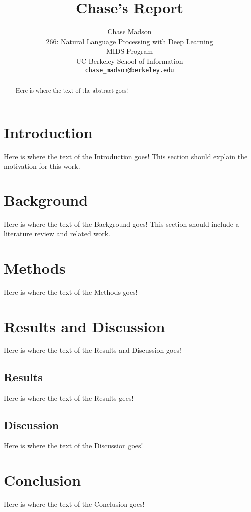 \documentclass[11pt,a4paper]{article}
\title{Chase's Report}
\author{Chase Madson \\
  266: Natural Language Processing with Deep Learning \\
  MIDS Program \\
  UC Berkeley School of Information \\
  \texttt{chase_madson@berkeley.edu} \\}
\date{}
\begin{document}
\maketitle
\begin{abstract}
Here is where the text of the abstract goes!
\end{abstract}


\section{Introduction}

Here is where the text of the Introduction goes! This section should explain the motivation for this work. 


\section{Background}

Here is where the text of the Background goes! This section should include a literature review and related work.


\section{Methods}

Here is where the text of the Methods goes!


\section{Results and Discussion}

Here is where the text of the Results and Discussion goes!


\subsection{Results}

Here is where the text of the Results goes!


\subsection{Discussion}

Here is where the text of the Discussion goes!


\section{Conclusion}

Here is where the text of the Conclusion goes!
\end{document}
